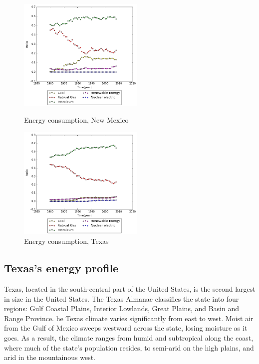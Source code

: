 \documentclass{mcmthesis}
\begin{document}
  \begin{figure}[htbp]
  \centering
  \begin{minipage}[t]{0.48\textwidth}
  \centering
  \includegraphics[width=6cm]{energyprofile_nm.png}
  \caption{Energy consumption, New Mexico}
  \end{minipage}
  \begin{minipage}[t]{0.48\textwidth}
  \centering
  \includegraphics[width=6cm]{energyprofile_tx.png}
  \caption{Energy consumption, Texas}
  \end{minipage}
  \end{figure}
\subsection{Texas's energy profile}
Texas, located in the south-central part of the United States, is the second largest in size in the United States.
The Texas Almanac classifies the state into four regions: Gulf Coastal Plains, Interior Lowlands, Great Plains, and Basin and Range Province.
he Texas climate varies significantly from east to west. Moist air from the Gulf of Mexico sweeps westward across the state, losing moisture as it goes.
 As a result, the climate ranges from humid and subtropical along the coast, where much of the state's population resides, to semi-arid on the high plains, and arid in the mountainous west.
\end{document}
